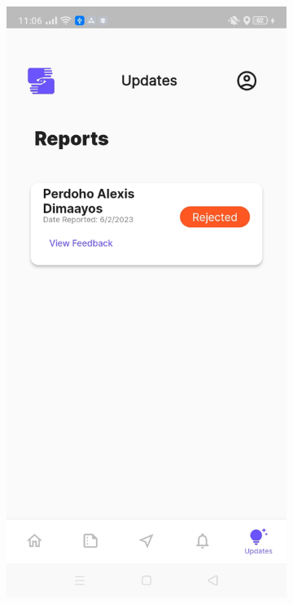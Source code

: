 \begin{figure}[!h]
    \centering
    \begin{subfigure}[c]{0.40\linewidth}
        \centering
        \includegraphics[scale=0.15]{figures/Chapter4/Main/Report-3.jpg}

\end{subfigure}
\end{figure}
